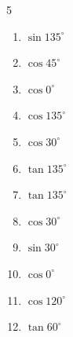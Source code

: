 \begin{multicols}{5}
\begin{enumerate}
        \phantom{$\displaystyle =-1$}

  \item $\displaystyle \sin{135^\circ}$


  \item $\displaystyle \cos{45^\circ}$


\columnbreak %

  \item $\displaystyle \cos{0^\circ}$

        \phantom{$\displaystyle =1$}

  \item $\displaystyle \cos{135^\circ}$


  \item $\displaystyle \cos{30^\circ}$


  \item $\displaystyle \tan{135^\circ}$

        \phantom{$\displaystyle =-1$}

  \item $\displaystyle \tan{135^\circ}$

        \phantom{$\displaystyle =-1$}

  \item $\displaystyle \cos{30^\circ}$


  \item $\displaystyle \sin{30^\circ}$


  \item $\displaystyle \cos{0^\circ}$

        \phantom{$\displaystyle =1$}

  \item $\displaystyle \cos{120^\circ}$


  \item $\displaystyle \tan{60^\circ}$



\end{enumerate}
\end{multicols}
